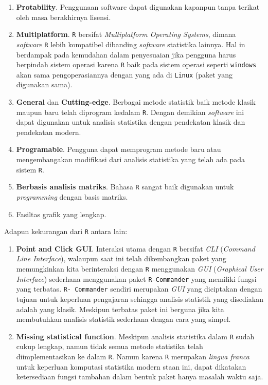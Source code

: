 \documentclass[]{book}
\providecommand{\tightlist}{%
  \setlength{\itemsep}{0pt}\setlength{\parskip}{0pt}}
\begin{document}
\begin{enumerate}
\def\labelenumi{\arabic{enumi}.}
\tightlist
\item
  \textbf{Protability}. Penggunaan software dapat digunakan kapanpun
  tanpa terikat oleh masa berakhirnya lisensi.
\item
  \textbf{Multiplatform}. \texttt{R} bersifat \emph{Multiplatform
  Operating Systems}, dimana \emph{software} \texttt{R} lebih kompatibel
  dibanding \emph{software} statistika lainnya. Hal in berdampak pada
  kemudahan dalam penyesuaian jika pengguna harus berpindah sistem
  operasi karena \texttt{R} baik pada sistem operasi seperti
  \texttt{windows} akan sama pengoperasiannya dengan yang ada di
  \texttt{Linux} (paket yang digunakan sama).
\item
  \textbf{General} dan \textbf{Cutting-edge}. Berbagai metode statistik
  baik metode klasik maupun baru telah diprogram kedalam \texttt{R}.
  Dengan demikian \emph{software} ini dapat digunakan untuk analisis
  statistika dengan pendekatan klasik dan pendekatan modern.
\item
  \textbf{Programable}. Pengguna dapat memprogram metode baru atau
  mengembangakan modifikasi dari analisis statistika yang telah ada pada
  sistem \texttt{R}.
\item
  \textbf{Berbasis analisis matriks}. Bahasa \texttt{R} sangat baik
  digunakan untuk \emph{programming} dengan basis matriks.
\item
  Fasiltas grafik yang lengkap.
\end{enumerate}

Adapun kekurangan dari \texttt{R} antara lain:

\begin{enumerate}
\def\labelenumi{\arabic{enumi}.}
\tightlist
\item
  \textbf{Point and Click GUI}. Interaksi utama dengan \texttt{R}
  bersifat \emph{CLI} (\emph{Command Line Interface}), walaupun saat ini
  telah dikembangkan paket yang memungkinkan kita berinteraksi dengan
  \texttt{R} menggunakan \emph{GUI} (\emph{Graphical User Interface})
  sederhana menggunakan paket \texttt{R-Commander} yang memiliki fungsi
  yang terbatas. \texttt{R-\ Commander} sendiri merupakan \emph{GUI}
  yang diciptakan dengan tujuan untuk keperluan pengajaran sehingga
  analisis statistik yang disediakan adalah yang klasik. Meskipun
  terbatas paket ini berguna jika kita membutuhkan analisis statistik
  sederhana dengan cara yang simpel.
\item
  \textbf{Missing statistical function}. Meskipun analisis statistika
  dalam \texttt{R} sudah cukup lengkap, namun tidak semua metode
  statistika telah diimplementasikan ke dalam \texttt{R}. Namun karena
  \texttt{R} merupakan \emph{lingua franca} untuk keperluan komputasi
  statistika modern staan ini, dapat dikatakan ketersediaan fungsi
  tambahan dalam bentuk paket hanya masalah waktu saja.
\end{enumerate}
\end{document}

